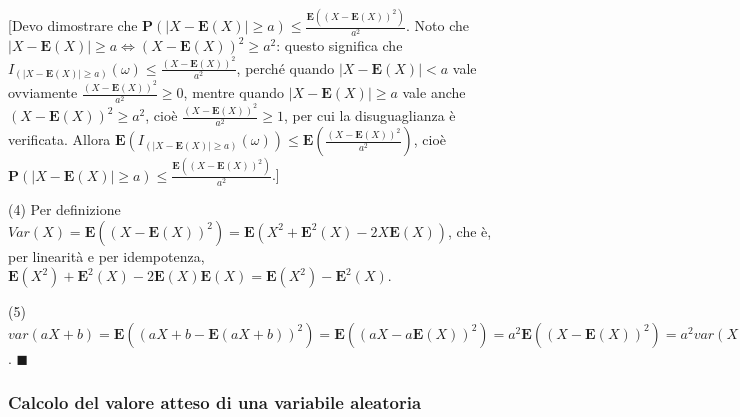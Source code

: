 \documentclass{article}
\begin{document}
[Devo dimostrare che $\mathbf{P}\left( \left\vert X-\mathbf{E}\left(
X\right) \right\vert \geq a\right) \leq \frac{\mathbf{E}\left( \left( X-%
\mathbf{E}\left( X\right) \right) ^{2}\right) }{a^{2}}$. Noto che $%
\left\vert X-\mathbf{E}\left( X\right) \right\vert \geq a\Longleftrightarrow
\left( X-\mathbf{E}\left( X\right) \right) ^{2}\geq a^{2}$: questo significa
che $I_{\left( \left\vert X-\mathbf{E}\left( X\right) \right\vert \geq
a\right) }\left( \omega \right) \leq \frac{\left( X-\mathbf{E}\left(
X\right) \right) ^{2}}{a^{2}}$, perch\'{e} quando $\left\vert X-\mathbf{E}%
\left( X\right) \right\vert <a$ vale ovviamente $\frac{\left( X-\mathbf{E}%
\left( X\right) \right) ^{2}}{a^{2}}\geq 0$, mentre quando $\left\vert X-%
\mathbf{E}\left( X\right) \right\vert \geq a$ vale anche $\left( X-\mathbf{E}%
\left( X\right) \right) ^{2}\geq a^{2}$, cio\`{e} $\frac{\left( X-\mathbf{E}%
\left( X\right) \right) ^{2}}{a^{2}}\geq 1$, per cui la disuguaglianza \`{e}
verificata. Allora $\mathbf{E}\left( I_{\left( \left\vert X-\mathbf{E}\left(
X\right) \right\vert \geq a\right) }\left( \omega \right) \right) \leq 
\mathbf{E}\left( \frac{\left( X-\mathbf{E}\left( X\right) \right) ^{2}}{a^{2}%
}\right) $, cio\`{e} $\mathbf{P}\left( \left\vert X-\mathbf{E}\left(
X\right) \right\vert \geq a\right) \leq \frac{\mathbf{E}\left( \left( X-%
\mathbf{E}\left( X\right) \right) ^{2}\right) }{a^{2}}$.]

(4) Per definizione $Var\left( X\right) =\mathbf{E}\left( \left( X-\mathbf{E}%
\left( X\right) \right) ^{2}\right) =\mathbf{E}\left( X^{2}+\mathbf{E}%
^{2}\left( X\right) -2X\mathbf{E}\left( X\right) \right) $, che \`{e}, per
linearit\`{a} e per idempotenza, $\mathbf{E}\left( X^{2}\right) +\mathbf{E}%
^{2}\left( X\right) -2\mathbf{E}\left( X\right) \mathbf{E}\left( X\right) =%
\mathbf{E}\left( X^{2}\right) -\mathbf{E}^{2}\left( X\right) $.

(5) $var\left( aX+b\right) =\mathbf{E}\left( \left( aX+b-\mathbf{E}\left(
aX+b\right) \right) ^{2}\right) =\mathbf{E}\left( \left( aX-a\mathbf{E}%
\left( X\right) \right) ^{2}\right) =a^{2}\mathbf{E}\left( \left( X-\mathbf{E%
}\left( X\right) \right) ^{2}\right) =a^{2}var\left( X\right) $. $%
\blacksquare $

\subsubsection{Calcolo del valore atteso di una variabile aleatoria}
\end{document}
